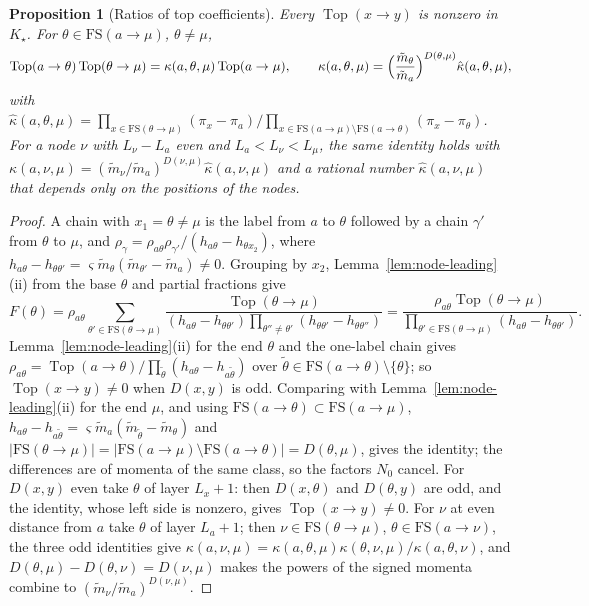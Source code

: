 \documentclass[twoside,10pt]{article}
\numberwithin{equation}{section}
\theoremstyle{slbody}
\newtheorem{proposition}[theorem]{Proposition}
\theoremstyle{definition}
\theoremstyle{remark}
\begin{document}
\begin{proposition}[Ratios of top coefficients]\label{prop:top-ratios}
Every $\operatorname{Top}(x\to y)$ is nonzero in $K_\star$.  For
$\theta\in\mathrm{FS}(a\to\mu)$, $\theta\neq\mu$,
\[
 \operatorname{Top}(a\to\theta)\operatorname{Top}(\theta\to\mu)
 =\kappa(a,\theta,\mu)\operatorname{Top}(a\to\mu),\qquad
 \kappa(a,\theta,\mu)=\Bigl(\frac{\tilde m_\theta}{\tilde m_a}\Bigr)^{D(\theta,\mu)}
 \hat\kappa(a,\theta,\mu),
\]
with
$\hat\kappa(a,\theta,\mu)=\prod_{x\in\mathrm{FS}(\theta\to\mu)}(\pi_x-\pi_a)\big/
\prod_{x\in\mathrm{FS}(a\to\mu)\setminus\mathrm{FS}(a\to\theta)}(\pi_x-\pi_\theta)$.
For a node $\nu$ with $L_\nu-L_a$ even and $L_a<L_\nu<L_\mu$, the same identity
holds with $\kappa(a,\nu,\mu)=(\tilde m_\nu/\tilde m_a)^{D(\nu,\mu)}\hat\kappa(a,\nu,\mu)$ and
a rational number $\hat\kappa(a,\nu,\mu)$ that depends only on the positions of
the nodes.
\end{proposition}

\begin{proof}
A chain with $x_1=\theta\neq\mu$ is the label from $a$ to $\theta$ followed by
a chain $\gamma'$ from $\theta$ to $\mu$, and
$\rho_\gamma=\rho_{a\theta}\rho_{\gamma'}/(h_{a\theta}-h_{\theta x_2})$, where
$h_{a\theta}-h_{\theta\theta'}=\varsigma \tilde m_\theta(\tilde m_{\theta'}-\tilde m_a)\neq0$.  Grouping
by $x_2$, Lemma~\ref{lem:node-leading}(ii) from the base $\theta$ and partial
fractions give
\[
 F(\theta)=\rho_{a\theta}\sum_{\theta'\in\mathrm{FS}(\theta\to\mu)}
 \frac{\operatorname{Top}(\theta\to\mu)}{(h_{a\theta}-h_{\theta\theta'})
 \prod_{\theta''\neq\theta'}(h_{\theta\theta'}-h_{\theta\theta''})}
 =\frac{\rho_{a\theta}\operatorname{Top}(\theta\to\mu)}
 {\prod_{\theta'\in\mathrm{FS}(\theta\to\mu)}(h_{a\theta}-h_{\theta\theta'})}.
\]
Lemma~\ref{lem:node-leading}(ii) for the end $\theta$ and the one-label chain gives
$\rho_{a\theta}=\operatorname{Top}(a\to\theta)/\prod_{\tilde\theta}(h_{a\theta}-h_{a\tilde\theta})$
over $\tilde\theta\in\mathrm{FS}(a\to\theta)\setminus\{\theta\}$; so
$\operatorname{Top}(x\to y)\neq0$ when $D(x,y)$ is odd.  Comparing with
Lemma~\ref{lem:node-leading}(ii) for the end $\mu$, and using
$\mathrm{FS}(a\to\theta)\subset\mathrm{FS}(a\to\mu)$,
$h_{a\theta}-h_{a\tilde\theta}=\varsigma \tilde m_a(\tilde m_{\tilde\theta}-\tilde m_\theta)$ and
$|\mathrm{FS}(\theta\to\mu)|=|\mathrm{FS}(a\to\mu)\setminus\mathrm{FS}(a\to\theta)|=D(\theta,\mu)$,
gives the identity; the differences are of momenta of the same class, so the
factors $N_0$ cancel.  For $D(x,y)$ even take $\theta$ of layer $L_x+1$: then
$D(x,\theta)$ and $D(\theta,y)$ are odd, and the identity, whose left side is
nonzero, gives $\operatorname{Top}(x\to y)\neq0$.  For $\nu$ at even distance
from $a$ take $\theta$ of layer $L_a+1$; then $\nu\in\mathrm{FS}(\theta\to\mu)$,
$\theta\in\mathrm{FS}(a\to\nu)$, the three odd identities give
$\kappa(a,\nu,\mu)=\kappa(a,\theta,\mu)\kappa(\theta,\nu,\mu)/\kappa(a,\theta,\nu)$,
and $D(\theta,\mu)-D(\theta,\nu)=D(\nu,\mu)$ makes the powers of the signed momenta combine to
$(\tilde m_\nu/\tilde m_a)^{D(\nu,\mu)}$.
\end{proof}
\end{document}
